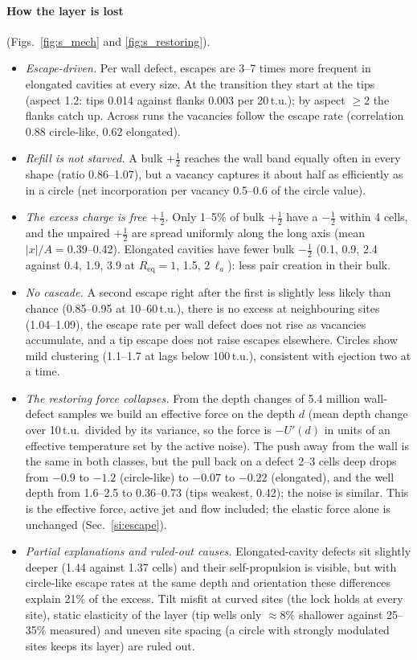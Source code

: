 \documentclass[aps,prl,onecolumn,superscriptaddress,amsmath,amssymb,nofootinbib]{revtex4-2}
\newcommand{\half}{\tfrac12}
\newcommand{\la}{\ell_a}
\begin{document}
\paragraph{How the layer is lost} (Figs.~\ref{fig:s_mech} and \ref{fig:s_restoring}).
\begin{itemize}
\item \emph{Escape-driven.} Per wall defect, escapes are 3--7 times more frequent in elongated cavities at every size. At the transition they start at the tips (aspect 1.2: tips 0.014
against flanks 0.003 per 20\,t.u.); by aspect $\geq2$ the flanks catch up. Across runs the vacancies follow the escape rate (correlation 0.88 circle-like, 0.62 elongated).
\item \emph{Refill is not starved.} A bulk $+\half$ reaches the wall band equally often in every shape (ratio 0.86--1.07), but a vacancy captures it about half as efficiently as in a
circle (net incorporation per vacancy 0.5--0.6 of the circle value).
\item \emph{The excess charge is free $+\half$.} Only 1--5\% of bulk $+\half$ have a $-\half$ within 4 cells, and the unpaired $+\half$ are spread uniformly along the long axis (mean
$|x|/A=0.39$--0.42). Elongated cavities have fewer bulk $-\half$ (0.1, 0.9, 2.4 against 0.4, 1.9, 3.9 at $R_\mathrm{eq}=1$, 1.5, $2\,\la$): less pair creation in their bulk.
\item \emph{No cascade.} A second escape right after the first is slightly less likely than chance (0.85--0.95 at 10--60\,t.u.), there is no excess at neighbouring sites (1.04--1.09),
the escape rate per wall defect does not rise as vacancies accumulate, and a tip escape does not raise escapes elsewhere. Circles show mild clustering (1.1--1.7 at lags below
100\,t.u.), consistent with ejection two at a time.
\item \emph{The restoring force collapses.} From the depth changes of 5.4 million wall-defect samples we build an effective force on the depth $d$ (mean depth change over 10\,t.u.\
divided by its variance, so the force is $-U'(d)$ in units of an effective temperature set by the active noise). The push away from the wall is the same in both classes, but the
pull back on a defect 2--3 cells deep drops from $-0.9$ to $-1.2$ (circle-like) to $-0.07$ to $-0.22$ (elongated), and the well depth from 1.6--2.5 to 0.36--0.73 (tips weakest, 0.42);
the noise is similar. This is the effective force, active jet and flow included; the elastic force alone is unchanged (Sec.~\ref{si:escape}).
\item \emph{Partial explanations and ruled-out causes.} Elongated-cavity defects sit slightly deeper (1.44 against 1.37 cells) and their self-propulsion is visible, but with
circle-like escape rates at the same depth and orientation these differences explain 21\% of the excess. Tilt misfit at curved sites (the lock holds at every site), static elasticity
of the layer (tip wells only $\approx8\%$ shallower against 25--35\% measured) and uneven site spacing (a circle with strongly modulated sites keeps its layer) are ruled out.
\end{itemize}
\end{document}
